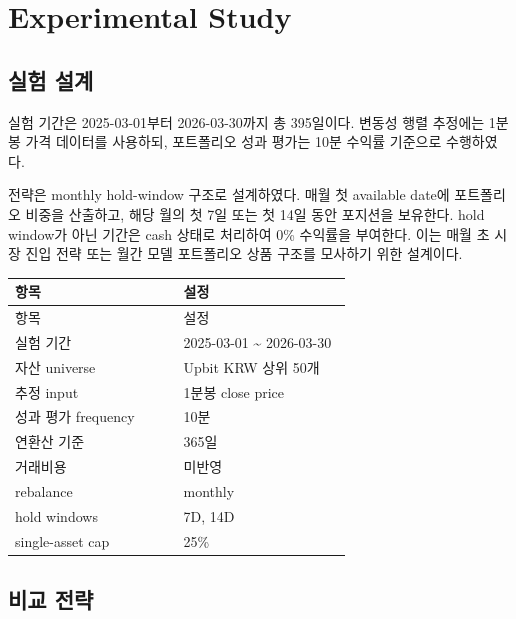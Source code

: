 \documentclass[12pt,a4paper]{article}
\begin{document}


\section{Experimental Study}

\subsection{실험 설계}

실험 기간은 2025-03-01부터 2026-03-30까지 총 395일이다. 변동성 행렬 추정에는 1분봉 가격 데이터를 사용하되, 포트폴리오 성과 평가는 10분 수익률 기준으로 수행하였다.

전략은 monthly hold-window 구조로 설계하였다. 매월 첫 available date에 포트폴리오 비중을 산출하고, 해당 월의 첫 7일 또는 첫 14일 동안 포지션을 보유한다. hold window가 아닌 기간은 cash 상태로 처리하여 0\% 수익률을 부여한다. 이는 매월 초 시장 진입 전략 또는 월간 모델 포트폴리오 상품 구조를 모사하기 위한 설계이다.

\begin{center}
\small
\begin{longtable}{@{}p{0.48\linewidth}p{0.48\linewidth}@{}}
\toprule
항목 & 설정 \\
\midrule
\endfirsthead
\toprule
항목 & 설정 \\
\midrule
\endhead
실험 기간 & 2025-03-01 \textasciitilde{} 2026-03-30 \\
자산 universe & Upbit KRW 상위 50개 \\
추정 input & 1분봉 close price \\
성과 평가 frequency & 10분 \\
연환산 기준 & 365일 \\
거래비용 & 미반영 \\
rebalance & monthly \\
hold windows & 7D, 14D \\
single-asset cap & 25\% \\
\bottomrule
\end{longtable}
\end{center}


\subsection{비교 전략}
\end{document}
